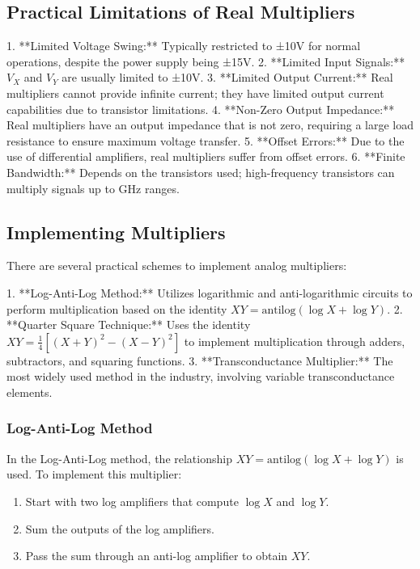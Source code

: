 \subsection*{Practical Limitations of Real Multipliers}

1. **Limited Voltage Swing:** Typically restricted to ±10V for normal operations, despite the power supply being ±15V.
2. **Limited Input Signals:** \( V_X \) and \( V_Y \) are usually limited to ±10V.
3. **Limited Output Current:** Real multipliers cannot provide infinite current; they have limited output current capabilities due to transistor limitations.
4. **Non-Zero Output Impedance:** Real multipliers have an output impedance that is not zero, requiring a large load resistance to ensure maximum voltage transfer.
5. **Offset Errors:** Due to the use of differential amplifiers, real multipliers suffer from offset errors.
6. **Finite Bandwidth:** Depends on the transistors used; high-frequency transistors can multiply signals up to GHz ranges.

\subsection*{Implementing Multipliers}

There are several practical schemes to implement analog multipliers:

1. **Log-Anti-Log Method:** Utilizes logarithmic and anti-logarithmic circuits to perform multiplication based on the identity \( XY = \text{antilog}(\log X + \log Y) \).
2. **Quarter Square Technique:** Uses the identity \( XY = \frac{1}{4}[(X + Y)^2 - (X - Y)^2] \) to implement multiplication through adders, subtractors, and squaring functions.
3. **Transconductance Multiplier:** The most widely used method in the industry, involving variable transconductance elements.

\subsubsection*{Log-Anti-Log Method}

In the Log-Anti-Log method, the relationship \( XY = \text{antilog}(\log X + \log Y) \) is used. To implement this multiplier:

\begin{enumerate}
    \item Start with two log amplifiers that compute \( \log X \) and \( \log Y \).
    \item Sum the outputs of the log amplifiers.
    \item Pass the sum through an anti-log amplifier to obtain \( XY \).
\end{enumerate}

